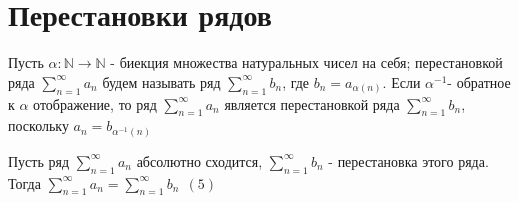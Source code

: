 \section{Перестановки рядов}
\begin{definition}
	Пусть $\alpha: \mathbb{N} \to \mathbb{N}$ - биекция множества натуральных чисел на себя; перестановкой ряда $\sum_{n=1}^{\infty}{a_n}$ будем называть ряд $\sum_{n=1}^{\infty}{b_n}$, где $b_n = a_{\alpha(n)}$. Если $\alpha^{-1}$- обратное к $\alpha$ отображение, то ряд $\sum_{n=1}^{\infty}{a_n}$ является перестановкой ряда $\sum_{n=1}^{\infty}{b_n}$, поскольку $a_n = b_{\alpha^{-1}(n)}$
\end{definition}
\begin{theorem}
	Пусть ряд $\sum_{n=1}^{\infty}{a_n}$ абсолютно сходится, $\sum_{n=1}^{\infty}{b_n}$ - перестановка этого ряда. Тогда $\sum_{n=1}^{\infty}{a_n}=\sum_{n=1}^{\infty}{b_n} \ \ (5)$
\end{theorem}
